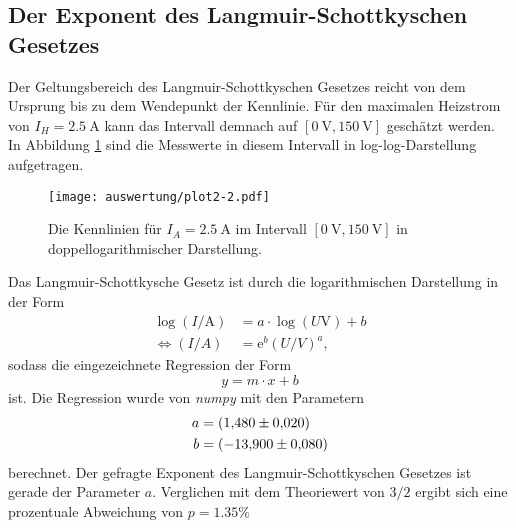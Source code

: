 \subsection{Der Exponent des Langmuir-Schottkyschen Gesetzes}
\label{sec:langschott}
Der Geltungsbereich des Langmuir-Schottkyschen Gesetzes reicht von dem Ursprung bis zu dem Wendepunkt der Kennlinie. Für den maximalen Heizstrom
von $I_H=\SI{2.5}{\ampere}$ kann das Intervall demnach auf $[\SI{0}{\volt}, \SI{150}{\volt}]$ geschätzt werden. In Abbildung \ref{fig:plot2} sind
die Messwerte in diesem Intervall in log-log-Darstellung aufgetragen.
\begin{figure}[H]
    \centering
    \texttt{[image: auswertung/plot2-2.pdf]}
    \caption{Die Kennlinien für $I_A=\SI{2.5}{\ampere}$ im Intervall $[\SI{0}{\volt}, \SI{150}{\volt}]$ in doppellogarithmischer Darstellung.}
    \label{fig:plot2}
\end{figure}
\noindent
Das Langmuir-Schottkysche Gesetz ist durch die logarithmischen Darstellung in der Form
\begin{align*}
    \log(I/\si{\ampere})&=a\cdot \log(U\si{\volt})+b\\
    \Leftrightarrow
    (I/A)&=\text{e}^b(U/V)^{a},  %
\end{align*}
sodass die eingezeichnete Regression der Form
\begin{equation}
    y=m\cdot x+b
    \label{eqn:gerade}
\end{equation}
ist. Die Regression wurde von \textit{numpy} \cite{numpy} mit den Parametern
\begin{align*}
    a &= \SI{1.48   \pm 0.020}{} \\
    b &= \SI{-13.90 \pm 0.080}{} 
\end{align*}
berechnet. Der gefragte Exponent des Langmuir-Schottkyschen Gesetzes ist gerade der Parameter $a$. Verglichen mit dem Theoriewert von $3/2$
ergibt sich eine prozentuale Abweichung von $p=\num{1.35}\%$

